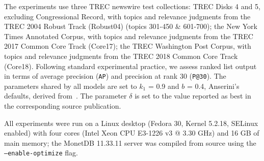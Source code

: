 The experiments use three TREC newswire test collections: TREC Disks 4 and 5, excluding Congressional Record, with topics and relevance judgments from the TREC 2004 Robust Track (Robust04) (topics 301-450 \& 601-700); the New York Times Annotated Corpus, with topics and relevance judgments from the TREC 2017 Common Core Track (Core17); the TREC Washington Post Corpus, with topics and relevance judgments from the TREC 2018 Common Core Track (Core18). Following standard experimental practice, we assess ranked list output in terms of average precision (\texttt{AP}) and precision at rank 30 (\texttt{P@30}). The parameters shared by all models are set to $k_1$ = 0.9 and $b$ = 0.4, Anserini’s defaults, derived from~\citet{ATIRE}. The parameter $\delta$ is set to the value reported as best in the corresponding source publication. 

All experiments were run on a Linux desktop (Fedora 30, Kernel 5.2.18, SELinux enabled) with four cores (Intel Xeon CPU E3-1226 v3 @ 3.30 GHz) and 16 GB of main memory; the MonetDB 11.33.11 server was compiled from source using the \texttt{---enable-optimize} flag.

